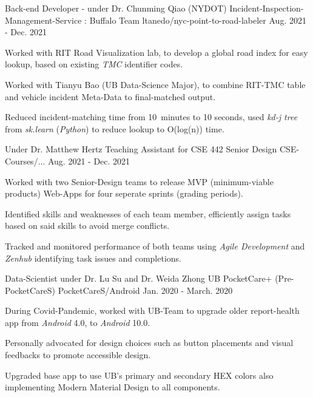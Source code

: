 \begin{cventries}
  \cventry
  {Back-end Developer - under Dr. Chunming Qiao} %
  {(NYDOT) Incident-Inspection-Management-Service : Buffalo Team} %
  { ltanedo/nyc-point-to-road-labeler } %
  {Aug. 2021 - Dec. 2021} %
  {
    \begin{cvitems} %
      \item { Worked with RIT Road Visualization lab, to develop a global road index for easy lookup, based on existing \textit{TMC} identifier codes. }
      \item { Worked with Tianyu Bao (UB Data-Science Major), to combine RIT-TMC table and vehicle incident Meta-Data to final-matched output. }
      \item { Reduced incident-matching time from 10~minutes to 10 seconds, used \textit{kd-j tree} from \textit{sk.learn} (\textit{Python}) to reduce lookup to O(log(n)) time.}
    \end{cvitems}
  }

  \cventry
  { Under Dr. Matthew Hertz } %
  { Teaching Assistant for CSE 442 Senior Design } %
  { CSE-Courses/... } %
  { Aug. 2021 - Dec. 2021 } %
  {
    \begin{cvitems} %
      \item { Worked with two Senior-Design teams to release MVP (minimum-viable products) Web-Apps for four seperate sprints (grading periods). }
      \item { Identified skills and weaknesses of each team member, efficiently assign tasks based on said skills to avoid merge conflicts.}
      \item { Tracked and monitored performance of both teams using \textit{Agile Development} and \textit{Zenhub} identifying task issues and completions.}
    \end{cvitems}
  }

  \cventry
  { Data-Scientist under Dr. Lu Su and Dr. Weida Zhong} %
  { UB PocketCare+ (Pre-PocketCareS) } %
  { PocketCareS/Android } %
  { Jan. 2020 - March. 2020 } %
  {
    \begin{cvitems} %
      \item { During Covid-Pandemic, worked with UB-Team to upgrade older report-health app from \textit{Android} 4.0, to \textit{Android} 10.0.}
      \item { Personally advocated for design choices such as button placements and visual feedbacks to promote accessible design. }
      \item { Upgraded base app to use UB's primary and secondary HEX colors also implementing Modern Material Design to all components.}
    \end{cvitems}
  }


\end{cventries}
